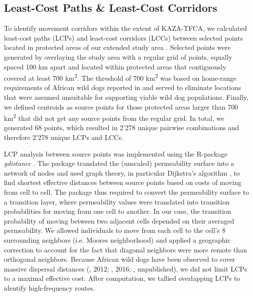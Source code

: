 \documentclass[abstract=on,10pt,a4paper,bibliography=totocnumbered]{scrartcl}
\begin{document}
\subsection{Least-Cost Paths \& Least-Cost Corridors}
To identify movement corridors within the extent of KAZA-TFCA, we calculated
least-cost paths (LCPs) and least-cost corridors (LCCs) between selected points
located in protected areas of our extended study area \citep{Adriaensen.2003,
Sawyer.2011}. Selected points were generated by overlaying the study area with a
regular grid of points, equally spaced 100 km apart and located within protected
areas that contiguously covered at least 700 km\textsuperscript{2}. The
threshold of 700 km\textsuperscript{2} was based on home-range requirements of
African wild dogs reported in \cite{Pomilia.2015} and served to eliminate
locations that were assumed unsuitable for supporting viable wild dog
populations. Finally, we defined centroids as source points for those protected
areas larger than 700 km\textsuperscript{2} that did not get any source points
from the regular grid. In total, we generated 68 points, which resulted in 2'278
unique pairwise combinations and therefore 2'278 unique LCPs and LCCs.

LCP analysis between source points was implemented using the R-package
\textit{gdistance} \citep{vanEtten.2018}. The package translated the (unscaled)
permeability surface into a network of nodes and used graph theory, in
particular Dijkstra's algorithm \citep{Dijkstra.1959}, to find shortest
effective distances between source points based on costs of moving from cell to
cell. The package thus required to convert the permeability surface to a
transition layer, where permeability values were translated into transition
probabilities for moving from one cell to another. In our case, the transition
probability of moving between two adjacent cells depended on their averaged
permeability. We allowed individuals to move from each cell to the cell's 8
surrounding neighbors (i.e. Moores neighborhood) and applied a geographic
correction to account for the fact that diagonal neighbors were more remote than
orthogonal neighbors. Because African wild dogs have been observed to cover
massive dispersal distances (\citeauthor{DaviesMostert.2012}, 2012;
\citeauthor{Masenga.2016}, 2016; \citeauthor{Cozzi.2020}, unpublished), we did
not limit LCPs to a maximal effective cost. After computation, we tallied
overlapping LCPs to identify high-frequency routes.
\end{document}
